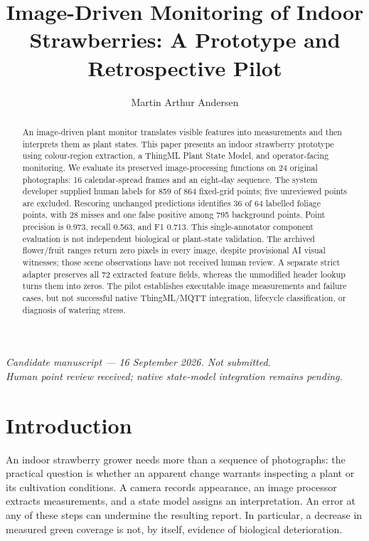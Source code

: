 \documentclass[runningheads]{llncs}
\title{Image-Driven Monitoring of Indoor Strawberries: A Prototype and Retrospective Pilot}
\author{Martin Arthur Andersen}
\institute{Halden, Norway}
\begin{document}
\maketitle
\begin{center}\small\textit{Candidate manuscript --- 16 September 2026. Not submitted.\\Human point review received; native state-model integration remains pending.}\end{center}
\begin{abstract}
An image-driven plant monitor translates visible features into measurements and then interprets them as plant states. This paper presents an indoor strawberry prototype using colour-region extraction, a ThingML Plant State Model, and operator-facing monitoring. We evaluate its preserved image-processing functions on 24 original photographs: 16 calendar-spread frames and an eight-day sequence. The system developer supplied human labels for 859 of 864 fixed-grid points; five unreviewed points are excluded. Rescoring unchanged predictions identifies 36 of 64 labelled foliage points, with 28 misses and one false positive among 795 background points. Point precision is 0.973, recall 0.563, and F1 0.713. This single-annotator component evaluation is not independent biological or plant-state validation. The archived flower/fruit ranges return zero pixels in every image, despite provisional AI visual witnesses; those scene observations have not received human review. A separate strict adapter preserves all 72 extracted feature fields, whereas the unmodified header lookup turns them into zeros. The pilot establishes executable image measurements and failure cases, but not successful native ThingML/MQTT integration, lifecycle classification, or diagnosis of watering stress.
\end{abstract}

\section{Introduction}
\label{sec:introduction}
An indoor strawberry grower needs more than a sequence of photographs: the practical question is whether an apparent change warrants inspecting a plant or its cultivation conditions. A camera records appearance, an image processor extracts measurements, and a state model assigns an interpretation. An error at any of these steps can undermine the resulting report. In particular, a decrease in measured green coverage is not, by itself, evidence of biological deterioration.
\end{document}
